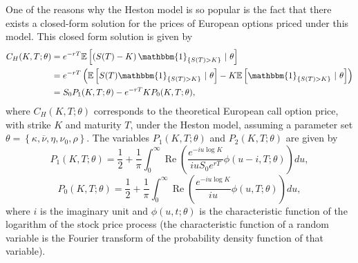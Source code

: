 One of the reasons why the Heston model is so popular is the fact that there exists a closed-form solution for the prices of European options priced under this model. This closed form solution is given by
\begin{equation}\label{CH}
\begin{split}
C_{H}(K,T;\theta)&=e^{-rT}\mathbb{E}\left[\left(S(T)-K\right)\mathbbm{1}_{\left\{S(T)>K\right\}}\ \vert\ \theta\right]\\
&=e^{-rT}\left(\mathbb{E}\left[S(T)\mathbbm{1}_{\left\{S(T)>K\right\}}\ \vert\ \theta\right]-K\mathbb{E}\left[\mathbbm{1}_{\left\{S(T)>K\right\}}\ \vert\ \theta\right]\right)\\
&=S_0P_1(K,T;\theta)-e^{-rT}KP_0(K,T;\theta),
\end{split}
\end{equation}
\noindent where $C_{H}(K,T;\theta)$ corresponds to the theoretical European call option price, with strike $K$ and maturity $T$, under the Heston model, assuming a parameter set $\theta=\left\{\kappa,\overline{\nu},\eta,\nu_0,\rho\right\}$. The variables $P_1(K,T;\theta)$ and $P_2(K,T;\theta)$ are given by
\begin{equation}\label{P1}
P_1(K,T;\theta)=\frac{1}{2}+\frac{1}{\pi}\int_0^\infty\operatorname{Re}\left(\frac{e^{-iu\log K}}{iuS_0e^{rT}}\phi(u-i,T;\theta)\right)du,
\end{equation}
\begin{equation}\label{P2}
P_0(K,T;\theta)=\frac{1}{2}+\frac{1}{\pi}\int_0^\infty\operatorname{Re}\left(\frac{e^{-iu\log K}}{iu}\phi(u,T;\theta)\right)du,
\end{equation}
\noindent where $i$ is the imaginary unit and $\phi(u,t;\theta)$ is the characteristic function of the logarithm of the stock price process (the characteristic function of a random variable is the Fourier transform of the probability density function of that variable).


